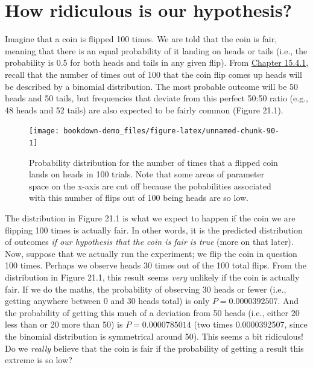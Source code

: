 \documentclass[
]{scrbook}
\begin{document}
\hypertarget{how-ridiculous-is-our-hypothesis}{%
\section{How ridiculous is our hypothesis?}\label{how-ridiculous-is-our-hypothesis}}

Imagine that a coin is flipped 100 times.
We are told that the coin is fair, meaning that there is an equal probability of it landing on heads or tails (i.e., the probability is 0.5 for both heads and tails in any given flip).
From \protect\hyperlink{Chapter_15.htmlux5cux23binomial-distribution}{Chapter 15.4.1}, recall that the number of times out of 100 that the coin flip comes up heads will be described by a binomial distribution.
The most probable outcome will be 50 heads and 50 tails, but frequencies that deviate from this perfect 50:50 ratio (e.g., 48 heads and 52 tails) are also expected to be fairly common (Figure 21.1).

\begin{figure}
\texttt{[image: bookdown-demo\_files/figure-latex/unnamed-chunk-90-1]} \caption{Probability distribution for the number of times that a flipped coin lands on heads in 100 trials. Note that some areas of parameter space on the x-axis are cut off because the pobabilities associated with this number of flips out of 100 being heads are so low.}\label{fig:unnamed-chunk-90}
\end{figure}

The distribution in Figure 21.1 is what we expect to happen if the coin we are flipping 100 times is actually fair.
In other words, it is the predicted distribution of outcomes \emph{if our hypothesis that the coin is fair is true} (more on that later).
Now, suppose that we actually run the experiment; we flip the coin in question 100 times.
Perhaps we observe heads 30 times out of the 100 total flips.
From the distribution in Figure 21.1, this result seems \emph{very} unlikely if the coin is actually fair.
If we do the maths, the probability of observing 30 heads or fewer (i.e., getting anywhere between 0 and 30 heads total) is only \(P = 0.0000392507\).
And the probability of getting this much of a deviation from 50 heads (i.e., either 20 less than or 20 more than 50) is \(P = 0.0000785014\) (two times 0.0000392507, since the binomial distribution is symmetrical around 50).
This seems a bit ridiculous!
Do we \emph{really} believe that the coin is fair if the probability of getting a result this extreme is so low?
\end{document}
